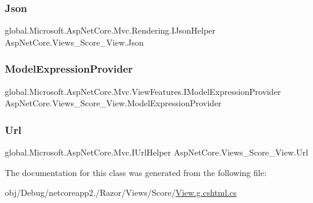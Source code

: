 \subsubsection{\texorpdfstring{Json}{Json}}
{\footnotesize\ttfamily global.\+Microsoft.\+Asp\+Net\+Core.\+Mvc.\+Rendering.\+I\+Json\+Helper Asp\+Net\+Core.\+Views\+\_\+\+Score\+\_\+\+View.\+Json\hspace{0.3cm}{\ttfamily [get]}}

\mbox{\label{class_asp_net_core_1_1_views___score___view_a48bef5d303941372532588982288a734}} 
\subsubsection{\texorpdfstring{ModelExpressionProvider}{ModelExpressionProvider}}
{\footnotesize\ttfamily global.\+Microsoft.\+Asp\+Net\+Core.\+Mvc.\+View\+Features.\+I\+Model\+Expression\+Provider Asp\+Net\+Core.\+Views\+\_\+\+Score\+\_\+\+View.\+Model\+Expression\+Provider\hspace{0.3cm}{\ttfamily [get]}}

\mbox{\label{class_asp_net_core_1_1_views___score___view_a75370b5025af5e9a76e0347e1123b6a1}} 
\subsubsection{\texorpdfstring{Url}{Url}}
{\footnotesize\ttfamily global.\+Microsoft.\+Asp\+Net\+Core.\+Mvc.\+I\+Url\+Helper Asp\+Net\+Core.\+Views\+\_\+\+Score\+\_\+\+View.\+Url\hspace{0.3cm}{\ttfamily [get]}}



The documentation for this class was generated from the following file\+:\begin{DoxyCompactItemize}
\item 
obj/\+Debug/netcoreapp2./\+Razor/\+Views/\+Score/\mbox{\hyperlink{_view_8g_8cshtml_8cs}{View.\+g.\+cshtml.\+cs}}\end{DoxyCompactItemize}

